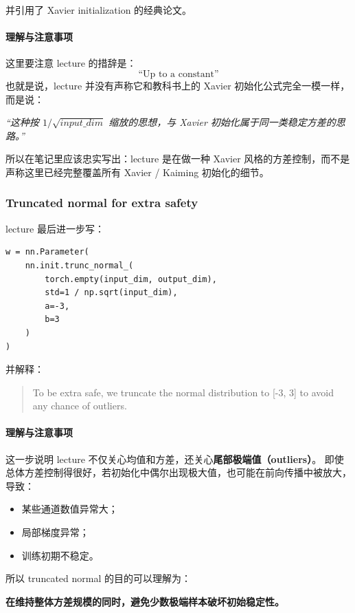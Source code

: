 \documentclass[a4paper,UTF8]{article}
\numberwithin{equation}{section}
\begin{document}
并引用了 Xavier initialization 的经典论文。

\paragraph{理解与注意事项}
这里要注意 lecture 的措辞是：
\[
\text{“Up to a constant”}
\]
也就是说，lecture 并没有声称它和教科书上的 Xavier 初始化公式完全一模一样，而是说：
\begin{center}
\emph{“这种按 \(1/\sqrt{input\_dim}\) 缩放的思想，与 Xavier 初始化属于同一类稳定方差的思路。”}
\end{center}

所以在笔记里应该忠实写出：lecture 是在做一种 Xavier 风格的方差控制，而不是声称这里已经完整覆盖所有 Xavier / Kaiming 初始化的细节。

\subsubsection{Truncated normal for extra safety}

lecture 最后进一步写：
\begin{verbatim}
w = nn.Parameter(
    nn.init.trunc_normal_(
        torch.empty(input_dim, output_dim),
        std=1 / np.sqrt(input_dim),
        a=-3,
        b=3
    )
)
\end{verbatim}

并解释：
\begin{quote}
To be extra safe, we truncate the normal distribution to [-3, 3] to avoid any chance of outliers.
\end{quote}

\paragraph{理解与注意事项}
这一步说明 lecture 不仅关心均值和方差，还关心\textbf{尾部极端值（outliers）}。  
即使总体方差控制得很好，若初始化中偶尔出现极大值，也可能在前向传播中被放大，导致：
\begin{itemize}
    \item 某些通道数值异常大；
    \item 局部梯度异常；
    \item 训练初期不稳定。
\end{itemize}

所以 truncated normal 的目的可以理解为：
\begin{center}
\textbf{在维持整体方差规模的同时，避免少数极端样本破坏初始稳定性。}
\end{center}
\end{document}
